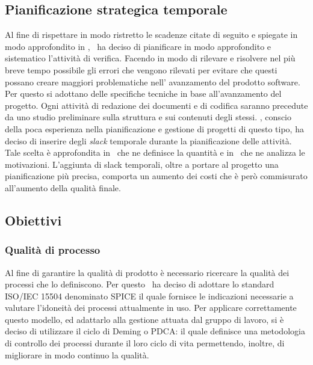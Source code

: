 \subsection{Pianificazione strategica temporale}
Al fine di rispettare in modo ristretto le scadenze citate di seguito e spiegate in modo approfondito in \infoPDP, \gruppo ~ha deciso di pianificare in modo approfondito e sistematico l'attività di verifica. Facendo in modo di rilevare e risolvere nel più breve tempo possibile gli errori che vengono rilevati per evitare che questi possano creare maggiori problematiche nell' avanzamento del prodotto software.\\
Per questo si adottano delle specifiche tecniche in base all'avanzamento del progetto. Ogni attività di redazione dei documenti e di codifica saranno precedute da uno studio preliminare sulla struttura e sui contenuti degli stessi.
\gruppo, conscio della poca esperienza nella pianificazione e gestione di progetti di questo tipo, ha deciso di inserire degli \textit{slack} temporale durante la pianificazione delle attività. Tale scelta è approfondita in \infoNDP ~che ne definisce la quantità e in \infoPDP ~che ne analizza le motivazioni.
L'aggiunta di slack temporali, oltre a portare al progetto una pianificazione più precisa, comporta un aumento dei costi che è però commisurato all'aumento della qualità finale.
\subsection{Obiettivi}
\subsubsection{Qualità di processo}
Al fine di garantire la qualità di prodotto è necessario ricercare la qualità dei processi che lo definiscono. Per questo \gruppo ~ha deciso di adottare lo standard ISO/IEC 15504 denominato SPICE il quale fornisce le indicazioni necessarie a valutare l'idoneità dei processi attualmente in uso.
Per applicare correttamente questo modello, ed adattarlo alla gestione attuata dal gruppo di lavoro, si è deciso di utilizzare il ciclo di Deming o PDCA: il quale definisce una metodologia di controllo dei processi durante il loro ciclo di vita permettendo, inoltre, di migliorare in modo continuo la qualità.
